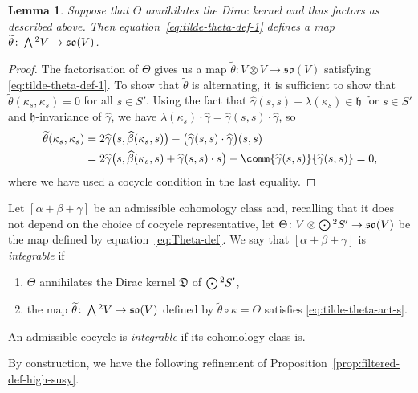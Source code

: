 \documentclass[10pt,a4paper]{amsart}
\numberwithin{equation}{section}
\newtheorem{Lemma}[Theorem]{Lemma}
\newcommand{\fh}{\mathfrak{h}}
\newcommand{\fso}{\mathfrak{so}}
\newcommand{\fD}{\mathfrak{D}}
\newcommand{\betahat}{\widehat{\beta}}
\newcommand{\gammahat}{\widehat{\gamma}}
\newcommand{\thetatilde}{\widetilde{\theta}}
\newcommand{\Wedge}{\mathchoice{{\textstyle\bigwedge}}{\bigwedge}{\bigwedge}{\bigwedge}}	%
\newcommand{\Odot}{\mathchoice{{\textstyle\bigodot}}{\bigodot}{\bigodot}{\bigodot}}
\newcommand{\1}{\mathbbm{1}}
\begin{document}
\begin{Lemma}\label{lemma:theta-well-def}
	Suppose that $\Theta$ annihilates the Dirac kernel and thus factors as described above. Then equation~\eqref{eq:tilde-theta-def-1} defines a map $\thetatilde\colon\Wedge^2V\to \fso(V)$.
\end{Lemma}

\begin{proof}
	The factorisation of $\Theta$ gives us a map $\thetatilde\colon V\otimes V \to \fso(V)$ satisfying \eqref{eq:tilde-theta-def-1}. To show that $\thetatilde$ is alternating, it is sufficient to show that $\thetatilde(\kappa_s,\kappa_s)=0$ for all $s\in S'$. Using the fact that $\gammahat(s,s)-\lambda(\kappa_s)\in\fh$ for $s\in S'$ and $\fh$-invariance of $\gammahat$, we have $\lambda(\kappa_s)\cdot\gammahat = \gammahat(s,s)\cdot\gammahat$, so
	\begin{align*}
		\thetatilde(\kappa_s,\kappa_s)
		&= 2\gammahat\bigl(s,\betahat(\kappa_s,s)\bigr) - \bigl(\gammahat(s,s)\cdot\gammahat\bigr)(s,s)\\
		& = 2\gammahat\bigl(s,\betahat(\kappa_s,s) + \gammahat(s,s)\cdot s\bigr) - \comm{\gammahat(s,s)}{\gammahat(s,s)}
		= 0,
	\end{align*}
	where we have used a cocycle condition in the last equality.
\end{proof}

\begin{Definition}\label{def:integrable-cocycle}
	Let $[\alpha+\beta+\gamma]$ be an admissible cohomology class and, recalling that it does not depend on the choice of cocycle representative, let $\Theta\colon V\otimes\Odot^2S'\to\fso(V) $ be the map defined by equation~\eqref{eq:Theta-def}. We say that $[\alpha+\beta+\gamma]$ is \emph{integrable} if
	\begin{enumerate}\itemsep=0pt
	\item $\Theta$ annihilates the Dirac kernel $\fD$ of $\Odot^2S'$,
	\item the map $\thetatilde\colon\Wedge^2 V\to \fso(V)$ defined by $\thetatilde\circ\kappa=\Theta$ satisfies	\eqref{eq:tilde-theta-act-s}.
	\end{enumerate}
	An admissible cocycle is \emph{integrable} if its cohomology class is.
\end{Definition}

By construction, we have the following refinement of Proposition~\ref{prop:filtered-def-high-susy}.
\end{document}

